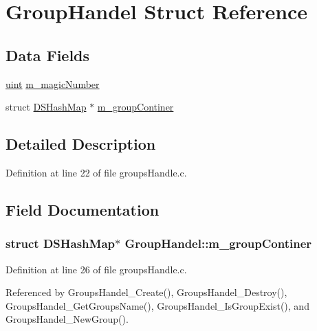 \hypertarget{structGroupHandel}{}\section{Group\+Handel Struct Reference}
\label{structGroupHandel}
\subsection*{Data Fields}
\begin{DoxyCompactItemize}
\item 
\hyperlink{tcp_8h_a91ad9478d81a7aaf2593e8d9c3d06a14}{uint} \hyperlink{structGroupHandel_a57ff08319c57f99db13ce449a532dad5}{m\+\_\+magic\+Number}
\item 
struct \hyperlink{structDSHashMap}{D\+S\+Hash\+Map} $\ast$ \hyperlink{structGroupHandel_a40d2ef5c996b36ec0e6b5512962d38c4}{m\+\_\+group\+Continer}
\end{DoxyCompactItemize}


\subsection{Detailed Description}


Definition at line 22 of file groups\+Handle.\+c.



\subsection{Field Documentation}
\subsubsection[{\texorpdfstring{m\+\_\+group\+Continer}{m_groupContiner}}]{\setlength{\rightskip}{0pt plus 5cm}struct {\bf D\+S\+Hash\+Map}$\ast$ Group\+Handel\+::m\+\_\+group\+Continer}\hypertarget{structGroupHandel_a40d2ef5c996b36ec0e6b5512962d38c4}{}\label{structGroupHandel_a40d2ef5c996b36ec0e6b5512962d38c4}


Definition at line 26 of file groups\+Handle.\+c.



Referenced by Groups\+Handel\+\_\+\+Create(), Groups\+Handel\+\_\+\+Destroy(), Groups\+Handel\+\_\+\+Get\+Groups\+Name(), Groups\+Handel\+\_\+\+Is\+Group\+Exist(), and Groups\+Handel\+\_\+\+New\+Group().

